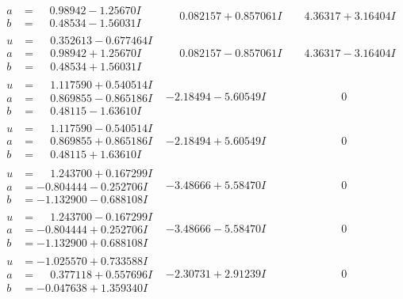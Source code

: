 \documentclass[1p]{elsarticle_modified}
\theoremstyle{definition}
\begin{document}
$$\begin{array}{c|c|c}
\begin{aligned}
a &= \phantom{-}0.98942 - 1.25670 I \\
b &= \phantom{-}0.48534 - 1.56031 I\end{aligned}
 & \phantom{-}0.082157 + 0.857061 I & \phantom{-}4.36317 + 3.16404 I \\ \hline\begin{aligned}
u &= \phantom{-}0.352613 - 0.677464 I \\
a &= \phantom{-}0.98942 + 1.25670 I \\
b &= \phantom{-}0.48534 + 1.56031 I\end{aligned}
 & \phantom{-}0.082157 - 0.857061 I & \phantom{-}4.36317 - 3.16404 I \\ \hline\begin{aligned}
u &= \phantom{-}1.117590 + 0.540514 I \\
a &= \phantom{-}0.869855 - 0.865186 I \\
b &= \phantom{-}0.48115 - 1.63610 I\end{aligned}
 & -2.18494 - 5.60549 I & \phantom{-0.000000 } 0 \\ \hline\begin{aligned}
u &= \phantom{-}1.117590 - 0.540514 I \\
a &= \phantom{-}0.869855 + 0.865186 I \\
b &= \phantom{-}0.48115 + 1.63610 I\end{aligned}
 & -2.18494 + 5.60549 I & \phantom{-0.000000 } 0 \\ \hline\begin{aligned}
u &= \phantom{-}1.243700 + 0.167299 I \\
a &= -0.804444 - 0.252706 I \\
b &= -1.132900 - 0.688108 I\end{aligned}
 & -3.48666 + 5.58470 I & \phantom{-0.000000 } 0 \\ \hline\begin{aligned}
u &= \phantom{-}1.243700 - 0.167299 I \\
a &= -0.804444 + 0.252706 I \\
b &= -1.132900 + 0.688108 I\end{aligned}
 & -3.48666 - 5.58470 I & \phantom{-0.000000 } 0 \\ \hline\begin{aligned}
u &= -1.025570 + 0.733588 I \\
a &= \phantom{-}0.377118 + 0.557696 I \\
b &= -0.047638 + 1.359340 I\end{aligned}
 & -2.30731 + 2.91239 I & \phantom{-0.000000 } 0 \\ \hline\begin{aligned}

\end{aligned}
\end{array}$$
\end{document}
